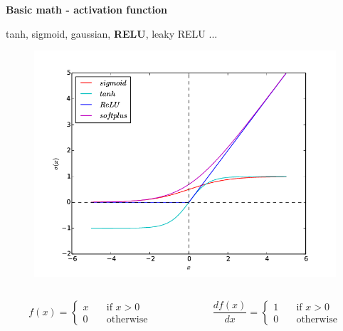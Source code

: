 \documentclass[xcolor=dvipsnames]{beamer}
\begin{document}
\begin{frame}[fragile]
{\bf Basic math - activation function}

tanh, sigmoid, gaussian, {\bf RELU}, leaky RELU ...
\begin{figure}
  \includegraphics[scale=0.2]{../../pictures/activation.png}
\end{figure}

\begin{columns}
\begin{column}{0.5\textwidth}
\[ f(x) =
  \begin{cases}
    x       & \quad \text{if } x > 0\\
    0       & \quad \text{otherwise}
  \end{cases}
\]
\end{column}
\begin{column}{0.5\textwidth}  %
\[ \frac{df(x)}{dx} =
  \begin{cases}
    1       & \quad \text{if } x > 0\\
    0       & \quad \text{otherwise}
  \end{cases}
\]
\end{column}
\end{columns}

\end{frame}
\end{document}
